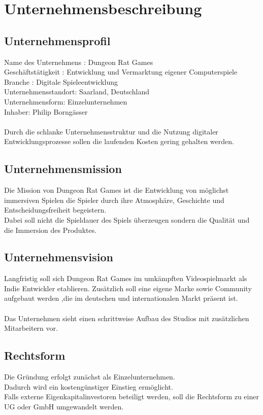 \documentclass[envcountsame,envcountchap deutsch]{i-studis}
\begin{document}
\chapter{Unternehmensbeschreibung}
\section{Unternehmensprofil}
Name des Unternehmens : Dungeon Rat Games \\
Geschäftstätigkeit : Entwicklung und Vermarktung eigener Computerspiele \\
Branche : Digitale Spieleentwicklung \\
Unternehmensstandort: Saarland, Deutschland \\
Unternehmensform: Einzelunternehmen \\
Inhaber: Philip Borngässer \\
\\
Durch die schlanke Unternehmensstruktur und die Nutzung digitaler Entwicklungsprozesse sollen die laufenden Kosten gering gehalten werden.
\section{Unternehmensmission}
Die Mission von Dungeon Rat Games ist die Entwicklung von möglichst immersiven Spielen die Spieler durch ihre Atmosphäre, Geschichte und Entscheidungsfreiheit begeistern.\\
Dabei soll nicht die Spieldauer des Spiels überzeugen sondern die Qualität und die Immersion des Produktes. 

\section{Unternehmensvision}
Langfristig soll sich Dungeon Rat Games im umkämpften Videospielmarkt  als Indie Entwickler etablieren. Zusätzlich soll eine eigene Marke sowie Community aufgebaut werden ,die im deutschen und internationalen Markt präsent ist.
\\
\\
Das Unternehmen sieht einen schrittweise Aufbau des Studios mit zusätzlichen Mitarbeitern vor.
\section{Rechtsform}
Die Gründung erfolgt zunächst als Einzelunternehmen.\\
Dadurch wird ein kostengünstiger Einstieg ermöglicht.\\
Falls externe Eigenkapitalinvestoren beteiligt werden, soll die Rechtsform zu einer UG oder GmbH umgewandelt werden.
\end{document}
